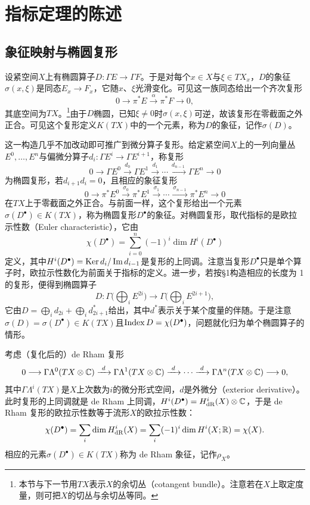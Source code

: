 \section{指标定理的陈述}
\subsection{象征映射与椭圆复形}
设紧空间$X$上有椭圆算子$D:\Gamma E\to\Gamma F$。于是对每个$x\in X$与$\xi\in TX_x$，$D$的象征$\sigma(x,\xi)$是同态$E_x\to F_x$，它随$x$、$\xi$光滑变化。可见这一族同态给出一个齐次复形
\[
0\longrightarrow\pi^*E\xrightarrow{\ \alpha\ }\pi^*F\longrightarrow 0,
\]
其底空间为$TX$。\footnote{本节与下一节用$TX$表示$X$的余切丛（cotangent bundle）。注意若在$X$上取定度量，则可把$X$的切丛与余切丛等同。}由于$D$椭圆，已知$\xi\neq 0$时$\sigma(x,\xi)$可逆，故该复形在零截面之外正合。可见这个复形定义$K(TX)$中的一个元素，称为$D$的象征，记作$\sigma(D)$。

这一构造几乎不加改动即可推广到微分算子复形。给定紧空间$X$上的一列向量丛$E^0,\ldots,E^n$与偏微分算子$d_i:\Gamma E^i\to\Gamma E^{i+1}$，称复形
\[
0\longrightarrow\Gamma E^0\xrightarrow{\ d_0\ }\Gamma E^1\xrightarrow{\ d_1\ }\cdots\xrightarrow{\ d_{n-1}\ }\Gamma E^n\longrightarrow 0
\]
为椭圆复形，若$d_{i+1}d_i=0$，且相应的象征复形
\[
0\longrightarrow\pi^*E^0\xrightarrow{\ \sigma_0\ }\pi^*E^1\xrightarrow{\ \sigma_1\ }\cdots\xrightarrow{\ \sigma_{n-1}\ }\pi^*E^n\longrightarrow 0
\]
在$TX$上于零截面之外正合。与前面一样，这个复形给出一个元素$\sigma(D^\bullet)\in K(TX)$，称为椭圆复形$D^\bullet$的象征。对椭圆复形，取代指标的是欧拉示性数（Euler characteristic），它由
\[
\chi(D^\bullet)=\sum_{i=0}^n(-1)^i\dim H^i(D^\bullet)
\]
定义，其中$H^i(D^\bullet)=\operatorname{Ker} d_i/\operatorname{Im} d_{i-1}$是复形的上同调。注意当复形$D^\bullet$只是单个算子时，欧拉示性数化为前面关于指标的定义。进一步，若按§1构造相应的长度为 1 的复形，便得到椭圆算子
\[
D:\Gamma\Big(\bigoplus_iE^{2i}\Big)\to\Gamma\Big(\bigoplus_iE^{2i+1}\Big),
\]
它由$D=\bigoplus_i d_{2i}+\bigoplus_i d^*_{2i+1}$给出，其中$d^*$表示关于某个度量的伴随。于是注意$\sigma(D)=\sigma(D^\bullet)\in K(TX)$且$\operatorname{Index} D=\chi(D^\bullet)$，问题就化归为单个椭圆算子的情形。

\begin{example}
考虑（复化后的）de Rham 复形
\[
0\longrightarrow\Gamma\Lambda^0(TX\otimes\C)\xrightarrow{\ d\ }\Gamma\Lambda^1(TX\otimes\C)\xrightarrow{\ d\ }\cdots\xrightarrow{\ d\ }\Gamma\Lambda^n(TX\otimes\C)\longrightarrow 0,
\]
其中$\Gamma\Lambda^i(TX)$是$X$上次数为$i$的微分形式空间，$d$是外微分（exterior derivative）。此时复形的上同调就是 de Rham 上同调，$H^i(D^\bullet)=H^i_{\mathrm{dR}}(X)\otimes\mathbb{C}$，于是 de Rham 复形的欧拉示性数等于流形$X$的欧拉示性数：
\[
\chi(D^\bullet)=\sum_i\dim H^i_{\mathrm{dR}}(X)=\sum_i(-1)^i\dim H^i(X;\mathbb{R})=\chi(X).
\]
相应的元素$\sigma(D^\bullet)\in K(TX)$称为 de Rham 象征，记作$\rho_X$。
\end{example}

